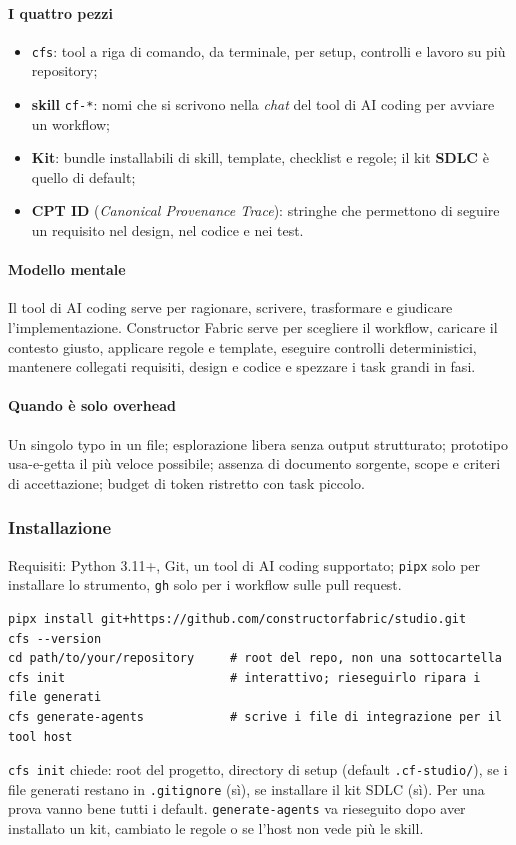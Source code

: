 \documentclass[a4paper,12pt]{article}
\begin{document}
\paragraph{I quattro pezzi}
\begin{itemize}
  \item \texttt{cfs}: tool a riga di comando, da terminale, per setup, controlli e lavoro
        su più repository;
  \item \textbf{skill} \texttt{cf-*}: nomi che si scrivono nella \emph{chat} del tool di
        AI coding per avviare un workflow;
  \item \textbf{Kit}: bundle installabili di skill, template, checklist e regole; il kit
        \textbf{SDLC} è quello di default;
  \item \textbf{CPT ID} (\emph{Canonical Provenance Trace}): stringhe che permettono di
        seguire un requisito nel design, nel codice e nei test.
\end{itemize}

\paragraph{Modello mentale} Il tool di AI coding serve per ragionare, scrivere,
trasformare e giudicare l'implementazione. Constructor Fabric serve per scegliere il
workflow, caricare il contesto giusto, applicare regole e template, eseguire controlli
deterministici, mantenere collegati requisiti, design e codice e spezzare i task grandi
in fasi.

\paragraph{Quando è solo overhead} Un singolo typo in un file; esplorazione libera senza
output strutturato; prototipo usa-e-getta il più veloce possibile; assenza di documento
sorgente, scope e criteri di accettazione; budget di token ristretto con task piccolo.

\subsubsection{Installazione}

Requisiti: Python 3.11+, Git, un tool di AI coding supportato; \texttt{pipx} solo per
installare lo strumento, \texttt{gh} solo per i workflow sulle pull request.
\begin{verbatim}
pipx install git+https://github.com/constructorfabric/studio.git
cfs --version
cd path/to/your/repository     # root del repo, non una sottocartella
cfs init                       # interattivo; rieseguirlo ripara i file generati
cfs generate-agents            # scrive i file di integrazione per il tool host
\end{verbatim}
\texttt{cfs init} chiede: root del progetto, directory di setup (default
\texttt{.cf-studio/}), se i file generati restano in \texttt{.gitignore} (sì), se
installare il kit SDLC (sì). Per una prova vanno bene tutti i default.
\texttt{generate-agents} va rieseguito dopo aver installato un kit, cambiato le regole o
se l'host non vede più le skill.
\end{document}
